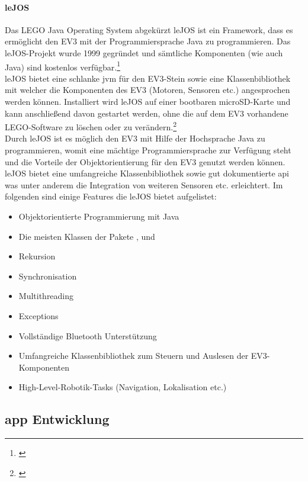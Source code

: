 \paragraph{leJOS}
Das LEGO Java Operating System abgekürzt leJOS ist ein Framework, dass es ermöglicht den EV3 mit der Programmiersprache Java zu programmieren. Das leJOS-Projekt wurde 1999 gegründet und sämtliche Komponenten (wie auch Java) sind kostenlos verfügbar.\footnote{\citep[vgl.][EV3-Programmieren mit Java, Seite 21]{Schobel.RobertaEV3Programmieren}\label{note34}} \\
leJOS bietet eine schlanke \gls{jvm} für den EV3-Stein sowie eine Klassenbibliothek mit welcher die Komponenten des EV3 (Motoren, Sensoren etc.) angesprochen werden können. Installiert wird leJOS auf einer bootbaren microSD-Karte und kann anschließend davon gestartet werden, ohne die auf dem EV3 vorhandene LEGO-Software zu löschen oder zu verändern.\footnote{\citep[vgl.][EV3-Programmieren mit Java, Seite 23]{Schobel.RobertaEV3Programmieren}\label{note35}} \\
Durch leJOS ist es möglich den EV3 mit Hilfe der Hochsprache Java zu programmieren, womit eine mächtige Programmiersprache zur Verfügung steht und die Vorteile der Objektorientierung für den EV3 genutzt werden können.
leJOS bietet eine umfangreiche Klassenbibliothek sowie gut dokumentierte \gls{api} was unter anderem die Integration von weiteren Sensoren etc. erleichtert.
Im folgenden sind einige Features die leJOS bietet aufgelistet:
\begin{itemize}
	\item{Objektorientierte Programmierung mit Java}
	\item{Die meisten Klassen der Pakete ,  und }
	\item{Rekursion}
	\item{Synchronisation}
	\item{Multithreading}
	\item{Exceptions}
	\item{Vollständige Bluetooth Unterstützung}
	\item{Umfangreiche Klassenbibliothek zum Steuern und Auslesen der EV3-Komponenten}
	\item{High-Level-Robotik-Tasks (Navigation, Lokalisation etc.)}
\end{itemize}

\newpage
\subsection{\gls{app} Entwicklung} %


